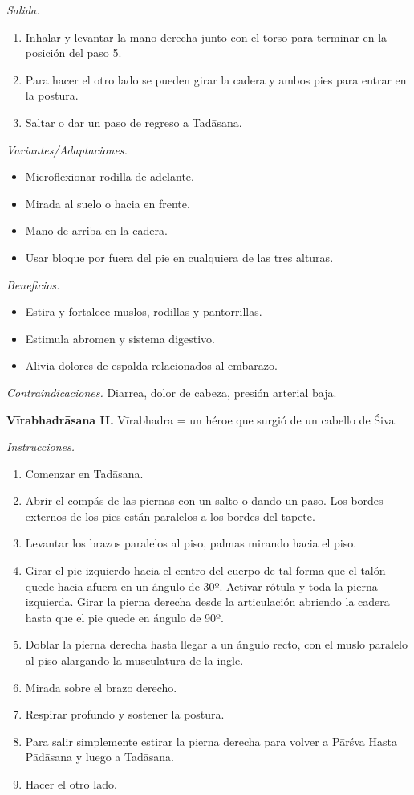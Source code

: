 \emph{Salida.}
\begin{enumerate}
\item Inhalar y levantar la mano derecha
junto con el torso para terminar en la
posición del paso 5.
\item Para hacer el otro lado se pueden girar
la cadera y ambos pies para entrar en la
postura.
\item Saltar o dar un paso de regreso a
Tadāsana.
\end{enumerate}

\emph{Variantes/Adaptaciones.}
\begin{itemize}
\item Microflexionar rodilla de adelante.
\item Mirada al suelo o hacia en frente.
\item Mano de arriba en la cadera.
\item Usar bloque por fuera del pie en
cualquiera de las tres alturas.
\end{itemize}

\emph{Beneficios.}
\begin{itemize}
\item Estira y fortalece muslos, rodillas y
pantorrillas.
\item Estimula abromen y sistema digestivo.
\item Alivia dolores de espalda relacionados
al embarazo.
\end{itemize}

\emph{Contraindicaciones.} Diarrea, dolor de
cabeza, presión arterial baja.

\medskip\noindent\textbf{Vīrabhadrāsana II.}
Vīrabhadra = un héroe que surgió de un
cabello de Śiva.

\emph{Instrucciones.}
\begin{enumerate}
\item Comenzar en Tadāsana.
\item Abrir el compás de las piernas con un
salto o dando un paso. Los bordes externos de
los pies están paralelos a los bordes del
tapete.
\item Levantar los brazos paralelos al piso,
palmas mirando hacia el piso.
\item Girar el pie izquierdo hacia el centro
del cuerpo de tal forma que el talón quede
hacia afuera en un ángulo de 30º. Activar
rótula y toda la pierna izquierda. Girar la
pierna derecha desde la articulación abriendo
la cadera hasta que el pie quede en ángulo de
90º.
\item Doblar la pierna derecha hasta llegar a
un ángulo recto, con el muslo paralelo al
piso alargando la musculatura de la ingle.
\item Mirada sobre el brazo derecho.
\item Respirar profundo y sostener la
postura.
\item Para salir simplemente estirar la
pierna derecha para volver a Pārśva Hasta
Pādāsana y luego a Tadāsana.
\item Hacer el otro lado.
\end{enumerate}

